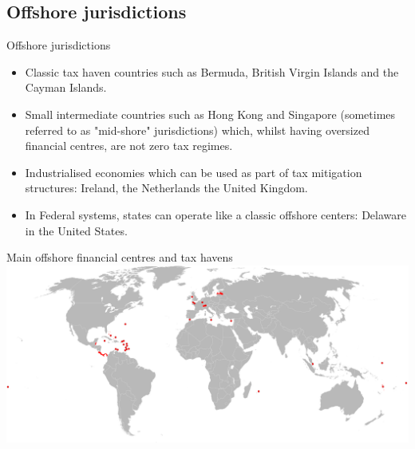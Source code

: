 \documentclass[international_finance_p2.tex]{subfiles}
\begin{document}
\subsection{Offshore jurisdictions}
\begin{frame}{Offshore jurisdictions}
\begin{itemize}[<+->]
\item
Classic tax haven countries such as Bermuda, British Virgin Islands and the Cayman Islands.
\item
Small intermediate countries such as Hong Kong and Singapore (sometimes referred to as "mid-shore" jurisdictions) which, whilst having oversized financial centres, are not zero tax regimes.
\item
Industrialised economies which can be used as part of tax mitigation structures: Ireland, the Netherlands the United Kingdom.
\item
In Federal systems, states can operate like a classic offshore centers: Delaware in the United States.
\end{itemize}
\end{frame}
\begin{frame}{Main offshore financial centres and tax havens}
\includegraphics[scale=0.35]{img/taxhavens}
\end{frame}
\end{document}

